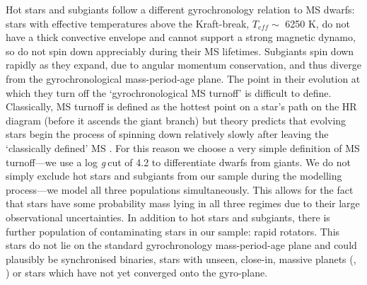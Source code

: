 \documentclass[10pt,preprint]{aastex}
\newcommand{\logg}{log \emph{g}}
\begin{document}
Hot stars and subgiants follow a different gyrochronology relation to MS dwarfs: stars with effective temperatures above the Kraft-break, $T_{eff} \sim$ 6250 K, \citep{Kraft1967} do not have a thick convective envelope and cannot support a strong magnetic dynamo, so do not spin down appreciably during their MS lifetimes.
Subgiants spin down rapidly as they expand, due to angular momentum conservation, and thus diverge from the gyrochronological mass-period-age plane.
The point in their evolution at which they turn off the `gyrochronological MS turnoff' is difficult to define.
Classically, MS turnoff is defined as the hottest point on a star's path on the HR diagram (before it ascends the giant branch) but theory predicts that evolving stars begin the process of spinning down relatively slowly after leaving the `classically defined' MS \citep{vanSaders2013}.
For this reason we choose a very simple definition of MS turnoff---we use a \logg$~$cut of 4.2 to differentiate dwarfs from giants.
We do not simply exclude hot stars and subgiants from our sample during the modelling process---we model all three populations simultaneously.
This allows for the fact that stars have some probability mass lying in all three regimes due to their large observational uncertainties.
In addition to hot stars and subgiants, there is further population of contaminating stars in our sample: rapid rotators.
This stars do not lie on the standard gyrochronology mass-period-age plane and could plausibly be synchronised binaries, stars with unseen, close-in, massive planets (\citet{Poppenhaeger2014}, \citet{Beky2014}) or stars which have not yet converged onto the gyro-plane.
\end{document}
